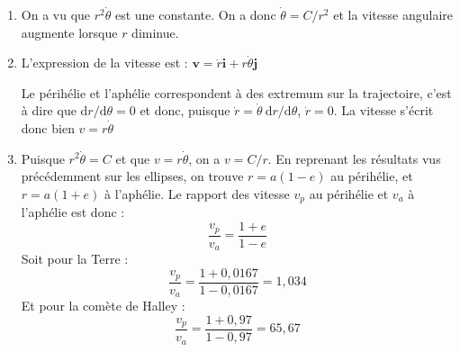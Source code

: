 \documentclass[a4paper,10pt]{report}
\newcounter{noexo}
\newenvironment{Exercise}[1][]{%
  \refstepcounter{noexo}
  \medskip\noindent\textbf{Exercice~\thenoexo~:~#1}
  \medskip\par
  \addcontentsline{toc}{paragraph}{Exercice~\thenoexo~:~#1}
  \label{exo:\thenoexo}
}{}
\renewcommand{\d}{\ensuremath{\mathrm{d}}}
\renewcommand{\vec}[1]{\ensuremath{\boldsymbol{#1}}}
\begin{document}
\begin{Answer}
  \begin{enumerate}
  \item On a vu que $r^2\dot{\theta}$ est une constante. On a donc
    $\dot{\theta}=C/r^2$ et la vitesse angulaire augmente lorsque $r$
    diminue.

  \item L'expression de la vitesse est : $\vec{v} = \dot{r}\vec{i} +
    r\dot{\theta}\vec{j}$

    Le périhélie et l'aphélie correspondent à des extremum sur la
    trajectoire, c'est à dire que $\d r/\d\theta =0$ et donc,
    puisque $\dot{r} = \dot{\theta}~\d r/\d\theta$,
    $\dot{r}=0$. La vitesse s'écrit donc bien $v = r\dot{\theta}$

  \item Puisque $r^2\dot{\theta}=C$ et que $v = r\dot{\theta}$, on a
    $v = C/r$. En reprenant les résultats vus précédemment sur les
    ellipses, on trouve $r = a(1-e)$ au périhélie, et $r = a(1+e)$ à
    l'aphélie. Le rapport des vitesse $v_p$ au périhélie et $v_a$ à
    l'aphélie est donc :
    $$
    \frac{v_p}{v_a} = \frac{1+e}{1-e}
    $$
    Soit pour la Terre :
    $$
    \frac{v_p}{v_a} = \frac{1+0,0167}{1-0,0167} = 1,034
    $$
    Et pour la comète de Halley :
    $$
    \frac{v_p}{v_a} = \frac{1+0,97}{1-0,97} = 65,67
    $$
  \end{enumerate}
\end{Answer}

\end{document}

